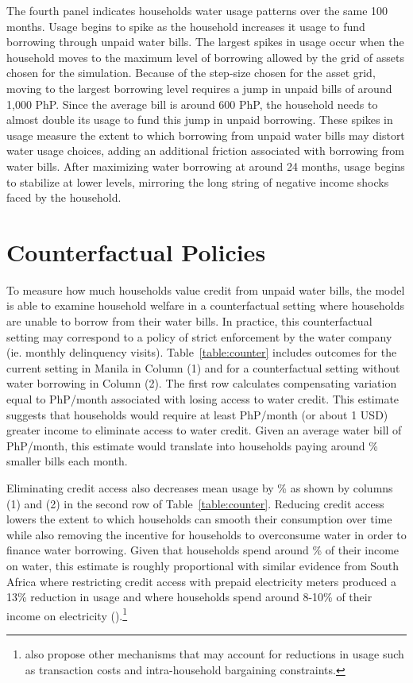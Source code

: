 \documentclass[12pt]{article}
\begin{document}
The fourth panel indicates households water usage patterns over the same 100 months.  Usage begins to spike as the household increases it usage to fund borrowing through unpaid water bills.  The largest spikes in usage occur when the household moves to the maximum level of borrowing allowed by the grid of assets chosen for the simulation.  Because of the step-size chosen for the asset grid, moving to the largest borrowing level requires a jump in unpaid bills of around 1,000 PhP.  Since the average bill is around 600 PhP, the household needs to almost double its usage to fund this jump in unpaid borrowing.  These spikes in usage measure the extent to which borrowing from unpaid water bills may distort water usage choices, adding an additional friction associated with borrowing from water bills.  After maximizing water borrowing at around 24 months, usage begins to stabilize at lower levels, mirroring the long string of negative income shocks faced by the household.  

\section{Counterfactual Policies}

To measure how much households value credit from unpaid water bills, the model is able to examine household welfare in a counterfactual setting where households are unable to borrow from their water bills.  In practice, this counterfactual setting may correspond to a policy of strict enforcement by the water company (ie. monthly delinquency visits).  Table~\ref{table:counter} includes outcomes for the current setting in Manila in Column (1) and for a counterfactual setting without water borrowing in Column (2).  The first row calculates compensating variation equal to PhP/month associated with losing access to water credit.  This estimate suggests that households would require at least PhP/month (or about 1 USD) greater income to eliminate access to water credit.  Given an average water bill of PhP/month, this estimate would translate into households paying around \unskip\% smaller bills each month.  

Eliminating credit access also decreases mean usage by \unskip\% as shown by columns (1) and (2) in the second row of Table~\ref{table:counter}.  Reducing credit access lowers the extent to which households can smooth their consumption over time while also removing the incentive for households to overconsume water in order to finance water borrowing.  Given that households spend around \unskip\% of their income on water, this estimate is roughly proportional with similar evidence from South Africa where restricting credit access with prepaid electricity meters produced a 13\% reduction in usage and where households spend around 8-10\% of their income on electricity (\cite{jack2016charging}).\footnote{\cite{jack2016charging} also propose other mechanisms that may account for reductions in usage such as transaction costs and intra-household bargaining constraints.}
\end{document}
